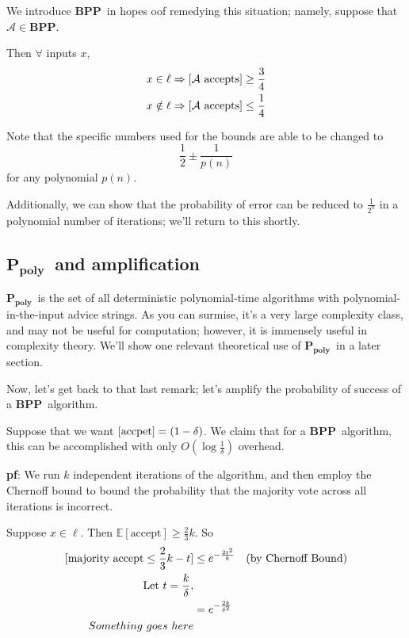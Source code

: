 \documentclass[11pt]{article}
\let\Pr\relax
\DeclareMathOperator*{\Pr}{\mathbb{P}}
\newcommand{\BPP}{\ensuremath{\mathbf{BPP}}}
\newcommand{\Ppoly}{\ensuremath{\mathbf{P_{poly}}}}
\newcommand{\Alg}{\ensuremath{\mathcal{A}}}
\begin{document}
We introduce \BPP\ in hopes oof remedying this situation; namely, suppose that $\Alg\in\BPP$. 

Then $\forall$ inputs $x$,
\begin{align*}
  x \in \ell &\Rightarrow \Pr[\Alg \text{ accepts}] \geq \frac{3}{4} \\
  x \notin \ell &\Rightarrow \Pr[\Alg \text{ accepts}] \leq \frac{1}{4} 
\end{align*}

Note that the specific numbers used for the bounds are able to be changed to 
$$\frac{1}{2} \pm \frac{1}{p(n)}$$
for any polynomial $p(n)$.

Additionally, we can show that the probability of error can be reduced to $\frac{1}{2^n}$ in a polynomial number of iterations; we'll return to this shortly.

\subsection{\Ppoly\ and amplification}

\Ppoly\ is the set of all deterministic polynomial-time algorithms with polynomial-in-the-input advice strings. As you can surmise, it's a very large complexity class, and may not be useful for computation; however, it is immensely useful in complexity theory.
We'll show one relevant theoretical use of \Ppoly\ in a later section.

Now, let's get back to that last remark; let's amplify the probability of success of a \BPP\ algorithm. 

Suppose that we want $\Pr[\text{accpet}] = (1-\delta)$. We claim that for a \BPP\ algorithm, this can be accomplished with only $O(\log{\frac{1}{\delta}})$ overhead.

\textbf{pf}: We run $k$ independent iterations of the algorithm, and then employ the Chernoff bound to bound the probability that the majority vote across all iterations is incorrect.

Suppose $x\in\ell$. Then $\mathbb{E}[\text{accept}] \geq \frac{2}{3}k$. 
So 
\begin{align*}
  \Pr[\text{majority accept} \leq \frac{2}{3}k - t] &\leq e^{-{\frac{2t^2}{k}}} &&\text{(by Chernoff Bound)} \\
  \text{Let } t = \frac{k}{\delta}, \\
  &= e^{-{\frac{2k}{{\delta}^2}}} \\
  Something\ goes\ here
\end{align*}
\end{document}
